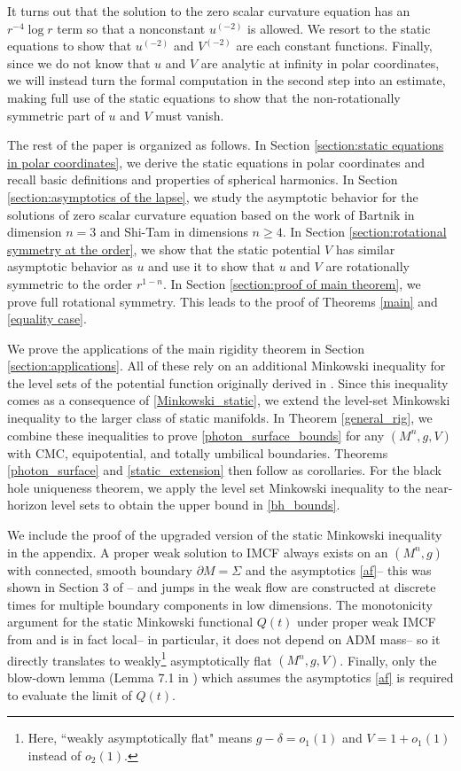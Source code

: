 \documentclass[12pt,twoside]{article}
\theoremstyle{plain}
\theoremstyle{definition}
\theoremstyle{remark}
\numberwithin{equation}{section}
\begin{document}
It turns out that the solution to the zero scalar curvature equation has an $r^{-4}\log r$ term so that a nonconstant $u^{(-2)}$ is allowed. We resort to the static equations to show that $u^{(-2)}$ and $V^{(-2)}$ are each constant functions. Finally, since we do not know that $u$ and $V$ are analytic at infinity in polar coordinates, we will instead turn the formal computation in the second step into an estimate, making full use of the static equations to show that the non-rotationally symmetric part of $u$ and $V$ must vanish.

The rest of the paper is organized as follows. In Section \ref{section:static equations in polar coordinates}, we derive the static equations in polar coordinates and recall basic definitions and properties of spherical harmonics. In Section \ref{section:asymptotics of the lapse}, we study the asymptotic behavior for the solutions of zero scalar curvature equation based on the work of Bartnik \cite{B} in dimension $n=3$ and Shi-Tam \cite{ST} in dimensions $n \ge 4$. In Section \ref{section:rotational symmetry at the order}, we show that the static potential $V$ has similar asymptotic behavior as $u$ and use it to show that $u$ and $V$ are rotationally symmetric to the order $r^{1-n}$. In Section \ref{section:proof of main theorem}, we prove full rotational symmetry. This leads to the proof of Theorems \ref{main} and \ref{equality case}.

We prove the applications of the main rigidity theorem in Section \ref{section:applications}. All of these rely on an additional Minkowski inequality for the level sets of the potential function originally derived in \cite{HW}. Since this inequality comes as a consequence of \eqref{Minkowski_static}, we extend the level-set Minkowski inequality to the larger class of static manifolds. In Theorem \ref{general_rig}, we combine these inequalities to prove \eqref{photon_surface_bounds} for any $(M^{n},g,V)$ with CMC, equipotential, and totally umbilical boundaries. Theorems \ref{photon_surface} and \ref{static_extension} then follow as corollaries. For the black hole uniqueness theorem, we apply the level set Minkowski inequality to the near-horizon level sets to obtain the upper bound in \eqref{bh_bounds}.

We include the proof of the upgraded version of the static Minkowski inequality in the appendix. A proper weak solution to IMCF always exists on an $(M^{n},g)$ with connected, smooth boundary $\partial M= \Sigma$ and the asymptotics \eqref{af}-- this was shown in Section 3 of \cite{HI}-- and jumps in the weak flow are constructed at discrete times for multiple boundary components in low dimensions. The monotonicity argument for the static Minkowski functional $Q(t)$ under proper weak IMCF from \cite{Wei} and \cite{Mc} is in fact local-- in particular, it does not depend on ADM mass-- so it directly translates to weakly\footnote{Here, ``weakly asymptotically flat" means $g-\delta = o_1(1)$ and $ V = 1 + o_1(1)$ instead of $o_2(1)$.} asymptotically flat $(M^{n},g,V)$. Finally, only the blow-down lemma (Lemma 7.1 in \cite{HI}) which assumes the asymptotics \eqref{af} is required to evaluate the limit of $Q(t)$. 
\end{document}
